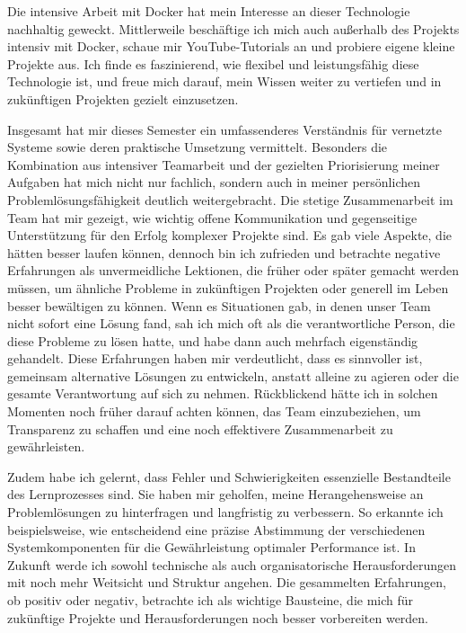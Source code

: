 Die intensive Arbeit mit Docker hat mein Interesse an dieser Technologie nachhaltig geweckt. Mittlerweile beschäftige ich mich auch außerhalb des Projekts intensiv mit Docker, schaue mir YouTube-Tutorials an und probiere eigene kleine Projekte aus. Ich finde es faszinierend, wie flexibel und leistungsfähig diese Technologie ist, und freue mich darauf, mein Wissen weiter zu vertiefen und in zukünftigen Projekten gezielt einzusetzen.

Insgesamt hat mir dieses Semester ein umfassenderes Verständnis für vernetzte Systeme sowie deren praktische Umsetzung vermittelt. Besonders die Kombination aus intensiver Teamarbeit und der gezielten Priorisierung meiner Aufgaben hat mich nicht nur fachlich, sondern auch in meiner persönlichen Problemlösungsfähigkeit deutlich weitergebracht. Die stetige Zusammenarbeit im Team hat mir gezeigt, wie wichtig offene Kommunikation und gegenseitige Unterstützung für den Erfolg komplexer Projekte sind. Es gab viele Aspekte, die hätten besser laufen können, dennoch bin ich zufrieden und betrachte negative Erfahrungen als unvermeidliche Lektionen, die früher oder später gemacht werden müssen, um ähnliche Probleme in zukünftigen Projekten oder generell im Leben besser bewältigen zu können. Wenn es Situationen gab, in denen unser Team nicht sofort eine Lösung fand, sah ich mich oft als die verantwortliche Person, die diese Probleme zu lösen hatte, und habe dann auch mehrfach eigenständig gehandelt. Diese Erfahrungen haben mir verdeutlicht, dass es sinnvoller ist, gemeinsam alternative Lösungen zu entwickeln, anstatt alleine zu agieren oder die gesamte Verantwortung auf sich zu nehmen. Rückblickend hätte ich in solchen Momenten noch früher darauf achten können, das Team einzubeziehen, um Transparenz zu schaffen und eine noch effektivere Zusammenarbeit zu gewährleisten.

Zudem habe ich gelernt, dass Fehler und Schwierigkeiten essenzielle Bestandteile des Lernprozesses sind. Sie haben mir geholfen, meine Herangehensweise an Problemlösungen zu hinterfragen und langfristig zu verbessern. So erkannte ich beispielsweise, wie entscheidend eine präzise Abstimmung der verschiedenen Systemkomponenten für die Gewährleistung optimaler Performance ist. In Zukunft werde ich sowohl technische als auch organisatorische Herausforderungen mit noch mehr Weitsicht und Struktur angehen. Die gesammelten Erfahrungen, ob positiv oder negativ, betrachte ich als wichtige Bausteine, die mich für zukünftige Projekte und Herausforderungen noch besser vorbereiten werden.
